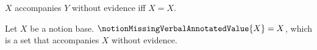 

\begin{definition}\label{notion_missing_result_accompanies}
    $X$ accompanies $Y$ without evidence iff $X=X$.
\end{definition}

\begin{definition}\label{notion_missing_verbal_annotated_value}
    Let $X$ be a notion base.
    $\notionMissingVerbalAnnotatedValue{X}=X$, which is a set
        that accompanies $X$ without evidence.
\end{definition}
